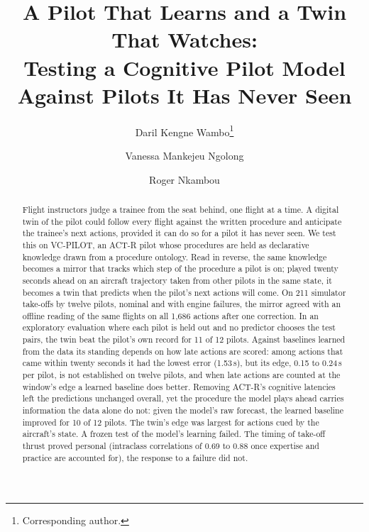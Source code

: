 \documentclass{llncs}
\begin{document}
\title{A Pilot That Learns and a Twin That Watches:\\Testing a Cognitive Pilot Model\\Against Pilots It Has Never Seen}

\author{Daril Kengne Wambo\thanks{Corresponding author.} \and Vanessa Mankejeu Ngolong \and Roger Nkambou}

\maketitle

\begin{abstract}
Flight instructors judge a trainee from the seat behind, one flight at a time. A digital twin of the pilot could follow every flight
against the written procedure and anticipate the trainee's next actions, provided it can do so for a pilot it has never seen. We test
this on VC-PILOT, an ACT-R pilot whose procedures are held as declarative knowledge drawn from a procedure ontology. Read in reverse,
the same knowledge becomes a mirror that tracks which step of the procedure a pilot is on; played twenty seconds ahead on an aircraft
trajectory taken from other pilots in the same state, it becomes a twin that predicts when the pilot's next actions will come. On 211
simulator take-offs by twelve pilots, nominal and with engine failures, the mirror agreed with an offline reading of the same flights on
all 1,686 actions after one correction. In an exploratory evaluation where each pilot is held out and no predictor chooses the test
pairs, the twin beat the pilot's own record for 11 of 12 pilots. Against baselines learned from the data its standing depends on how
late actions are scored: among actions that came within twenty seconds it had the lowest error (1.53\,s), but its edge, 0.15 to 0.24\,s
per pilot, is not established on twelve pilots, and when late actions are counted at the window's edge a learned baseline does better.
Removing ACT-R's cognitive latencies left the predictions unchanged overall, yet the procedure the model plays ahead carries information
the data alone do not: given the model's raw forecast, the learned baseline improved for 10 of 12 pilots. The twin's edge was largest for
actions cued by the aircraft's state. A frozen test of the model's learning failed. The timing of take-off thrust proved personal (intraclass correlations
of 0.69 to 0.88 once expertise and practice are accounted for), the response to a failure did not.

\end{abstract}
\end{document}
